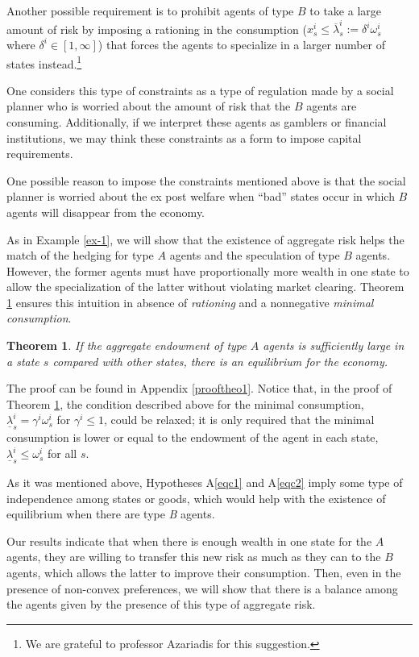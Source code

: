 \documentclass[pdftex]{article}
\numberwithin{equation}{section}
\theoremstyle{th}
\newtheorem{thm}{{Theorem}}%
\newtheorem{proof lemma}{{Proof Lemma}.}
\theoremstyle{definition}
\newtheorem*{risk lovers}{Risk lovers}
\newtheorem*{risk averse}{Risk averse}
\begin{document}
Another possible requirement is to prohibit agents of type $B$ to take a large amount of risk by imposing a rationing in the consumption ($x^i_s\leq\overline{\lambda}^i_s:=\delta^i\omega_s^i$ where $\delta^i\in[1,\infty]$) that forces the agents to specialize in a larger number of states instead.\footnote{We are grateful to professor Azariadis for this suggestion.}


{One considers this type of constraints as a type of regulation made by a social planner who is worried about the amount of risk that the $B$ agents are consuming. Additionally, if we interpret these agents as gamblers or financial institutions, we may think these constraints as a form to impose capital requirements.}

{One possible reason to impose the constraints mentioned above is that the social planner is worried about the ex post welfare when ``bad'' states occur in which $B$ agents will disappear from the economy.}


{As in Example \ref{ex-1}, we will show that the existence of aggregate risk helps the match of the hedging for type $A$ agents and the speculation of type $B$ agents. However, the former agents must have proportionally more wealth in one state to allow the specialization of the latter without violating market clearing.} Theorem \ref{theo1} ensures this intuition in absence of \emph{rationing} and a nonnegative \emph{minimal consumption}.

\begin{thm}
\label{theo1}
{If the aggregate endowment of type $A$ agents is sufficiently large in a state $s$ compared with other states, there is an equilibrium for the economy.}

\end{thm}

{The proof can be found in Appendix \ref{prooftheo1}. Notice that, in the proof of Theorem \ref{theo1}, the condition described above for the minimal consumption, $\underline{\lambda}^i_s=\gamma^i\omega^i_s$ for $\gamma^i\leq1$, could be relaxed; it is only required that the minimal consumption is lower or equal to the endowment of the agent in each state, $\underline{\lambda}^i_s\leq\omega^i_s$ for all $s$.}

As it was mentioned above, Hypotheses A\ref{eqc1} and A\ref{eqc2} imply some type of independence among states or goods, which would help with the existence of equilibrium when there are type \emph{B} agents.


Our results indicate that when there is enough wealth in one state for the $A$ agents, they are willing to transfer this new risk as much as they can to the $B$ agents, which allows the latter to improve their consumption. Then, even in the presence of non-convex preferences, we will show that there is a balance among the agents given by the presence of this type of aggregate risk.
\end{document}
